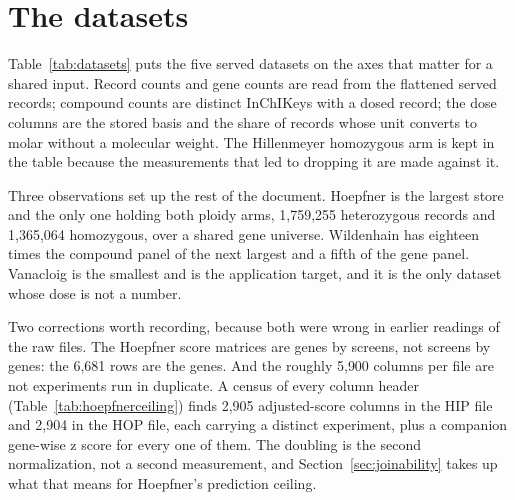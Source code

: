 
\section{The datasets}
\label{sec:datasets}

Table~\ref{tab:datasets} puts the five served datasets on the axes that matter for a shared
input. Record counts and gene counts are read from the flattened served records; compound
counts are distinct InChIKeys with a dosed record; the dose columns are the stored basis and
the share of records whose unit converts to molar without a molecular weight. The Hillenmeyer
homozygous arm is kept in the table because the measurements that led to dropping it are made
against it.

\begin{table}[htbp]
\centering
\footnotesize
\caption{The five served chemogenomic datasets. Records and genes come from the flattened
served records, compounds are distinct InChIKeys with a dosed record, and the last column is
the share of records whose dose unit converts to molar. The Hillenmeyer homozygous arm is
dropped from the model (Section~\ref{sec:question}).}
\label{tab:datasets}

\end{table}

Three observations set up the rest of the document. Hoepfner is the largest store and the
only one holding both ploidy arms, 1{,}759{,}255 heterozygous records and 1{,}365{,}064
homozygous, over a shared gene universe. Wildenhain has eighteen times the compound panel of
the next largest and a fifth of the gene panel. Vanacloig is the smallest and is the
application target, and it is the only dataset whose dose is not a number.

Two corrections worth recording, because both were wrong in earlier readings of the raw files.
The Hoepfner score matrices are genes by screens, not screens by genes: the 6{,}681 rows are
the genes. And the roughly 5{,}900 columns per file are not experiments run in duplicate. A
census of every column header (Table~\ref{tab:hoepfnerceiling}) finds 2{,}905 adjusted-score
columns in the HIP file and 2{,}904 in the HOP file, each carrying a distinct experiment, plus
a companion gene-wise z score for every one of them. The doubling is the second normalization,
not a second measurement, and Section~\ref{sec:joinability} takes up what that means for
Hoepfner's prediction ceiling.

